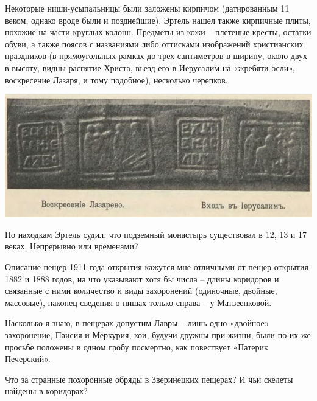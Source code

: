 Некоторые ниши-усыпальницы были заложены кирпичом (датированным 11 веком, однако вроде были и позднейшие). Эртель нашел также кирпичные плиты, похожие на части круглых колонн. Предметы из кожи – плетеные кресты, остатки обуви, а также поясов с названиями либо оттисками изображений христианских праздников (в прямоугольных рамках до трех сантиметров в ширину, около двух в высоту, видны распятие Христа, въезд его в Иерусалим на «жребяти осли», воскресение Лазаря, и тому подобное), несколько черепков.

\begin{center}
\includegraphics[width=\linewidth]{chast-colebanie-osnov/nachalo/poyasa.jpg}
\end{center}


По находкам Эртель судил, что подземный монастырь существовал в 12, 13 и 17 веках. Непрерывно или временами?

Описание пещер 1911 года открытия кажутся мне отличными от пещер открытия 1882 и 1888 годов, на что указывают хотя бы числа – длины коридоров и связанные с ними количество и виды захоронений (одиночные, двойные, массовые), наконец сведения о нишах только справа – у Матвеенковой.


Насколько я знаю, в пещерах допустим Лавры – лишь одно «двойное» захоронение, Паисия и Меркурия, кои, будучи дружны при жизни, были по их же просьбе положены в одном гробу посмертно, как повествует «Патерик Печерский».

Что за странные похоронные обряды в Зверинецких пещерах? И чьи скелеты найдены в коридорах?


